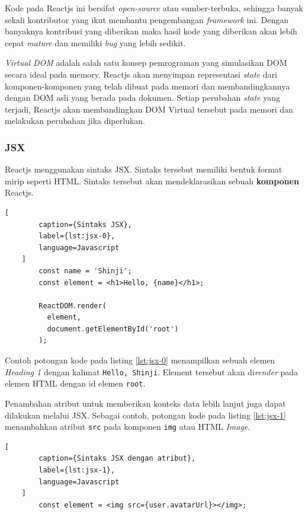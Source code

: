     Kode pada Reactjs ini bersifat \textit{open-source} atau sumber-terbuka, sehingga banyak sekali kontributor yang ikut membantu pengembangan \textit{framework} ini. Dengan banyaknya kontribusi yang diberikan maka hasil kode yang diberikan akan lebih cepat \textit{mature} dan memiliki \textit{bug} yang lebih sedikit.

    \textit{Virtual DOM} adalah salah satu konsep pemrograman yang simulasikan DOM secara ideal pada memory\cite{facebook:react-faq}. Reactjs akan menyimpan representasi \textit{state} dari komponen-komponen yang telah dibuat pada memori dan membandingkannya dengan
    DOM asli yang berada pada dokumen. Setiap perubahan \textit{state} yang terjadi, Reactjs akan membandingkan DOM Virtual tersebut pada memori dan melakukan perubahan jika diperlukan.
    
    \subsubsection{JSX}
    Reactjs menggunakan sintaks JSX. Sintaks tersebut memiliki bentuk format mirip seperti HTML. Sintaks tersebut akan mendeklarasikan sebuah \textbf{komponen} Reactjs.
    \begin{lstlisting}[
        caption={Sintaks JSX}, 
        label={lst:jsx-0}, 
        language=Javascript
    ]
        const name = 'Shinji';
        const element = <h1>Hello, {name}</h1>;
        
        ReactDOM.render(
          element,
          document.getElementById('root')
        );
    \end{lstlisting}
    
    Contoh potongan kode pada listing \ref{lst:jsx-0} menampilkan sebuah elemen \textit{Heading 1} dengan kalimat \texttt{Hello, Shinji}. Element tersebut akan di\textit{render} pada elemen HTML dengan id elemen \texttt{root}.
    
    Penambahan atribut untuk memberikan konteks data lebih lanjut juga dapat dilakukan melalui JSX. Sebagai contoh, potongan kode pada listing \ref{lst:jsx-1} menambahkan atribut \texttt{src} pada komponen \texttt{img} atau HTML \textit{Image}.
    
    \begin{lstlisting}[
        caption={Sintaks JSX dengan atribut}, 
        label={lst:jsx-1}, 
        language=Javascript
    ]
        const element = <img src={user.avatarUrl}></img>;
    \end{lstlisting}
    
